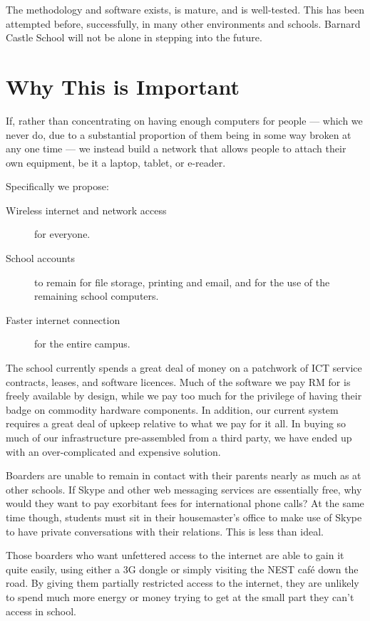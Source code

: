 \documentclass[a4paper,leqno,titlepage]{article}
\begin{document}
The methodology and software exists, is mature, and is well-tested. This has
been attempted before, successfully, in many other environments and schools.
Barnard Castle School will not be alone in stepping into the future.


\break

\section{Why This is Important}


If, rather than concentrating on having enough computers for people --- which we
never do, due to a substantial proportion of them being in some way broken
at any one time --- we instead build a network that allows people to attach their
own equipment, be it a laptop, tablet, or e-reader.

Specifically we propose:
    
\begin{description}

\item[Wireless internet and network access] for everyone.
\item[School accounts] to remain for file storage, printing and email, and for
the use of the remaining school computers.
\item[Faster internet connection] for the entire campus.


\end{description}


The school currently spends a great deal of money on a patchwork of ICT
service contracts, leases, and software licences.
Much of the software we pay RM for is freely available by design, while we pay
too much for the privilege of having their badge on commodity hardware components.
In addition, our current system requires a great deal of upkeep relative to
what we pay for it all. In buying so much of our infrastructure pre-assembled
from a third party, we have ended up with an over-complicated and
expensive solution.


Boarders are unable to remain in contact with their parents nearly as much
as at other schools. If Skype and other web messaging services are essentially free, why
would they want to pay exorbitant fees for international phone calls?
At the same time though, students must sit in their housemaster's office to make
use of Skype to have private conversations with their relations.
This is less than ideal.


Those boarders who want unfettered access to the internet are
able to gain it quite easily, using either a 3G dongle or simply visiting the NEST
café down the road. By giving them partially restricted access to the internet,
they are unlikely to spend much more energy or money trying to get at the small part
they can't access in school.
\end{document}
